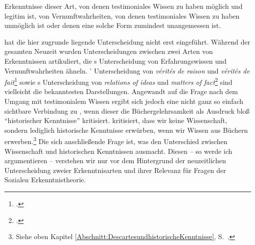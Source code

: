 Erkenntnisse dieser Art, von denen testimoniales Wissen zu haben möglich und
legitim ist, von Vernunftwahrheiten, von denen testimoniales Wissen zu haben
unmöglich ist oder denen eine solche Form zumindest unangemessen ist.


 hat die hier zugrunde liegende Unterscheidung nicht erst
eingeführt. Während der gesamten Neuzeit wurden Unterscheidungen zwischen zwei
Arten von Erkenntnissen artikuliert, die s Unterscheidung
von Erfahrungswissen und Vernunftwahrheiten ähneln.
' Unterscheidung
von \emph{v{\'e}rit{\'e}s de raison} und \emph{v{\'e}rit{\'e}s de
fait}\footnote{\cite[Vgl.][\S~33]{Leibniz:Lamonadologie2002}.}
sowie s Unterscheidung von
\emph{relations of ideas} und \emph{matters of
fact}\footnote{\cite[Vgl.][20--23]{Hume:AnEnquiryConcerningHumanUnderstanding1964}.}
sind vielleicht die bekanntesten Darstellungen.
Angewandt auf die Frage nach dem Umgang mit testimonialem Wissen ergibt sich
jedoch eine nicht ganz so einfach sichtbare Verbindung zu
, wenn dieser die
Büchergelehrsamkeit als Ausdruck bloß \enquote{historischer Kenntnisse}
kritisiert.  kritisiert, dass wir
keine Wissenschaft, sondern lediglich historische Kenntnisse erwürben, wenn wir
Wissen aus Büchern erwerben.\footnote{Siehe oben Kapitel
\ref{Abschnitt:DescartesundhistorischeKenntnisse},
S.~\pageref{Abschnitt:DescartesundhistorischeKenntnisse}.} Die sich
anschließende Frage ist, was den Unterschied zwischen Wissenschaft
und historischen Kenntnissen ausmacht. Diesen -- so werde ich argumentieren --
verstehen wir nur vor dem Hintergrund der neuzeitlichen Unterscheidung zweier
Erkenntnisarten und ihrer Relevanz für Fragen der Sozialen
Erkenntnistheorie.

